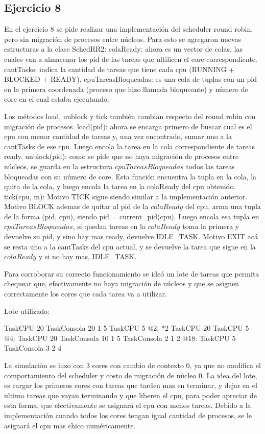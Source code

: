 \subsection{Ejercicio 8}

En el ejercicio 8 se pide realizar una implementación del scheduler round robin, pero sin migración de procesos entre núcleos.
Para esto se agregaron nuevas estructuras a la clase SchedRR2:
colaReady: ahora es un vector de colas, las cuales van a almacenar los pid de las tareas que ultilicen el core correspondiente.
cantTasks: indica la cantidad de tareas que tiene cada cpu (RUNNING + BLOCKED + READY).
cpuTareasBloqueadas: es una cola de tuplas con un pid en la primera coordenada (proceso que hizo llamada bloqueante) y número de core en el cual estaba ejecutando.

Los métodos load, unblock y tick también cambian respecto del round robin con migración de procesos.
load(pid): ahora se encarga primero de buscar cual es el cpu con menor cantidad de tareas y, una vez encontrado, sumar uno a la cantTasks de ese cpu. Luego encola la tarea en la cola correspondiente de tareas ready.
unblock(pid): como se pide que no haya migración de procesos entre núcleos, se guarda en la estructura $cpuTareasBloqueadas$ todos las tareas bloqueadas con su número de 
core. Esta función encuentra la tupla en la cola, la quita de la cola, y luego encola la tarea en la colaReady del cpu obtenido.
tick(cpu, m): 
Motivo TICK sigue siendo similar a la implementación anterior.
Motivo BLOCK ademas de quitar al pid de la $colaReady$ del cpu, arma una tupla de la forma (pid, cpu), siendo pid = current_pid(cpu). Luego encola esa tupla en $cpuTareasBloqueadas$, 
si quedan tareas en la $colaReady$ toma la primera y devuelve su pid, y sino hay mas ready, devuelve IDLE_TASK.
Motivo EXIT acá se resta uno a la cantTasks del cpu actual, y se devuelve la tarea que sigue en la $colaReady$ y si no hay mas, IDLE_TASK.

Para corroborar su correcto funcionamiento se ideó un lote de tareas que permita chequear que, efectivamente no haya migración de núcleos y que se asignen correctamente 
los cores que cada tarea va a utilizar. 

Lote utilizado:

TaskCPU 20		
TaskConsola 20	1 5	
TaskCPU 5
@2: 
*2 TaskCPU 20
TaskCPU 5
@4:
TaskCPU 20
TaskConsola 10 1 5
TaskConsola 2 1 2
@18:				
TaskCPU 5
TaskConsola 3 2 4

La simulación se hizo con 3 cores con cambio de contexto 0, ya que no modifica el comportamiento del scheduler y costo de migración de núcleo 0.
La idea del lote, es cargar los primeros cores con tareas que tarden mas en terminar, y dejar en el ultimo tareas que vayan terminando y que liberen el cpu, 
para poder apreciar de esta forma, que efectivamente se asignará el cpu con menos tareas.
Debido a la implementación cuando todos los cores tengan igual cantidad de procesos, se le asignará el cpu mas chico numéricamente. 

